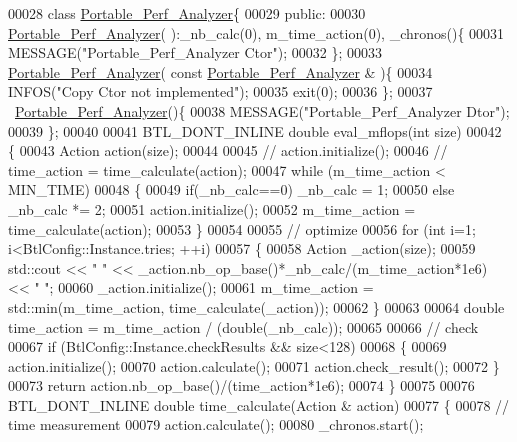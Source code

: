 \begin{DoxyCode}
00028 \textcolor{keyword}{class }\hyperlink{class_portable___perf___analyzer}{Portable\_Perf\_Analyzer}\{
00029 \textcolor{keyword}{public}:
00030   \hyperlink{class_portable___perf___analyzer}{Portable\_Perf\_Analyzer}( ):\_nb\_calc(0), m\_time\_action(0), \_chronos()\{
00031     MESSAGE(\textcolor{stringliteral}{"Portable\_Perf\_Analyzer Ctor"});
00032   \};
00033   \hyperlink{class_portable___perf___analyzer}{Portable\_Perf\_Analyzer}( \textcolor{keyword}{const} \hyperlink{class_portable___perf___analyzer}{Portable\_Perf\_Analyzer} & )\{
00034     INFOS(\textcolor{stringliteral}{"Copy Ctor not implemented"});
00035     exit(0);
00036   \};
00037   ~\hyperlink{class_portable___perf___analyzer}{Portable\_Perf\_Analyzer}()\{
00038     MESSAGE(\textcolor{stringliteral}{"Portable\_Perf\_Analyzer Dtor"});
00039   \};
00040 
00041   BTL\_DONT\_INLINE \textcolor{keywordtype}{double} eval\_mflops(\textcolor{keywordtype}{int} size)
00042   \{
00043     Action action(size);
00044 
00045 \textcolor{comment}{//     action.initialize();}
00046 \textcolor{comment}{//     time\_action = time\_calculate(action);}
00047     \textcolor{keywordflow}{while} (m\_time\_action < MIN\_TIME)
00048     \{
00049       \textcolor{keywordflow}{if}(\_nb\_calc==0) \_nb\_calc = 1;
00050       \textcolor{keywordflow}{else}            \_nb\_calc *= 2;
00051       action.initialize();
00052       m\_time\_action = time\_calculate(action);
00053     \}
00054 
00055     \textcolor{comment}{// optimize}
00056     \textcolor{keywordflow}{for} (\textcolor{keywordtype}{int} i=1; i<BtlConfig::Instance.tries; ++i)
00057     \{
00058       Action \_action(size);
00059       std::cout << \textcolor{stringliteral}{" "} << \_action.nb\_op\_base()*\_nb\_calc/(m\_time\_action*1e6) << \textcolor{stringliteral}{" "};
00060       \_action.initialize();
00061       m\_time\_action = std::min(m\_time\_action, time\_calculate(\_action));
00062     \}
00063 
00064     \textcolor{keywordtype}{double} time\_action = m\_time\_action / (double(\_nb\_calc));
00065 
00066     \textcolor{comment}{// check}
00067     \textcolor{keywordflow}{if} (BtlConfig::Instance.checkResults && size<128)
00068     \{
00069       action.initialize();
00070       action.calculate();
00071       action.check\_result();
00072     \}
00073     \textcolor{keywordflow}{return} action.nb\_op\_base()/(time\_action*1e6);
00074   \}
00075 
00076   BTL\_DONT\_INLINE \textcolor{keywordtype}{double} time\_calculate(Action & action)
00077   \{
00078     \textcolor{comment}{// time measurement}
00079     action.calculate();
00080     \_chronos.start();

\end{DoxyCode}
